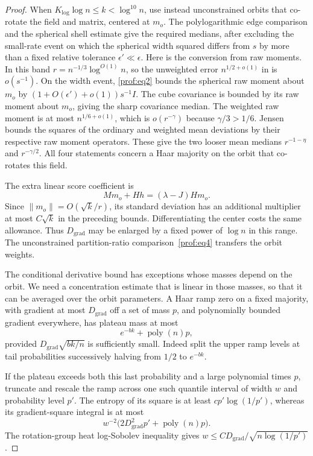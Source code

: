 \begin{proof}
When \(K_{\log}\log n\le k<\log^{10}n\), use instead unconstrained
orbits that co-rotate the field and matrix, centered at \(m_o\).
The polylogarithmic edge comparison and the spherical shell estimate
give the required medians, after excluding the small-rate event on
which the spherical width squared differs from \(s\) by more than a
fixed relative tolerance \(\epsilon'\ll\epsilon\). Here is the
conversion from raw moments. In this band
\(r=n^{-1/3}\log^{O(1)}n\), so the unweighted error
\(n^{1/2+o(1)}\) in  is \(o(s^{-1})\).
On the width event, \eqref{prof:eq2} bounds the spherical raw
moment about \(m_o\) by
\((1+O(\epsilon')+o(1))s^{-1}I\). The cube covariance is bounded
by its raw moment about \(m_o\), giving the sharp covariance
median. The weighted raw moment is at most \(n^{1/6+o(1)}\),
which is \(o(r^{-\gamma})\) because \(\gamma/3>1/6\).
Jensen bounds the squares of the ordinary and weighted mean
deviations by their respective raw moment operators. These give
the two looser mean medians \(r^{-1-\eta}\) and
\(r^{-\gamma/2}\). All four statements concern a Haar majority
on the orbit that co-rotates this field.

The extra linear
score coefficient is
\[
 Mm_o+Hh=(\lambda-J)Hm_o.
\]
Since \(\|m_o\|=O(\sqrt k/r)\), its standard deviation has an
additional multiplier at most \(C\sqrt k\) in the preceding bounds.
Differentiating the center costs the same allowance.  Thus
\(D_{\mathrm{grad}}\) may be enlarged by a fixed power of \(\log n\)
in this range.  The unconstrained partition-ratio comparison~\eqref{prof:eq4} transfers
the orbit weights.

The conditional derivative bound has exceptions whose masses depend
on the orbit. We need a concentration estimate that is linear in those
masses, so that it can be averaged over the orbit parameters.  A Haar ramp zero on a
fixed majority, with gradient at most \(D_{\mathrm{grad}}\) off a set
of mass \(p\), and polynomially bounded gradient everywhere, has
plateau mass at most
\[
 e^{-bk}+\operatorname{poly}(n)p,
\]
provided \(D_{\mathrm{grad}}\sqrt{bk/n}\) is sufficiently small.
Indeed split the upper ramp levels at tail probabilities successively
halving from \(1/2\) to \(e^{-bk}\).

If the plateau exceeds both
this last probability and a large polynomial times \(p\), truncate
and rescale the ramp across one such quantile interval of width \(w\)
and probability level \(p'\).  The entropy of its square is at least
\(cp'\log(1/p')\), whereas its gradient-square integral is at most
\[
 w^{-2}\bigl(2D_{\mathrm{grad}}^2p'
                         +\operatorname{poly}(n)p\bigr).
\]
The rotation-group heat log-Sobolev inequality gives
\(w\le CD_{\mathrm{grad}}/\sqrt{n\log(1/p')}\).


\end{proof}
